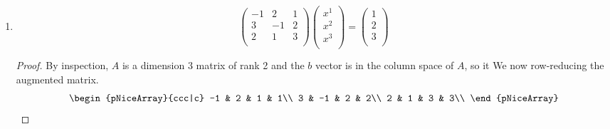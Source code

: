 \documentclass[../psets.tex]{subfiles}
\begin{document}
\begin{enumerate}
\begin{enumerate}
\begin{proof}
\begin{equation*}
\begin{pNiceArray}{cc|c}
                \end{pNiceArray}
            \end{equation*}
            Therefore, the solution is
            \begin{equation*}
                \boxed{
                    x =
                    \begin{pNiceMatrix}
                        \frac{1}{5}\\
                        -\frac{3}{5}\\
                    \end{pNiceMatrix}
                }
            \end{equation*}
        \end{proof}
        \item 
        \begin{equation*}
            \begin{pmatrix}
                -1 & 2 & 1\\
                3 & -1 & 2\\
                2 & 1 & 3\\
            \end{pmatrix}
            \begin{pmatrix}
                x^1\\
                x^2\\
                x^3\\
            \end{pmatrix}
            =
            \begin{pmatrix}
                1\\
                2\\
                3\\
            \end{pmatrix}
        \end{equation*}
        \begin{proof}
            By inspection, $A$ is a dimension 3 matrix of rank 2 and the $b$ vector is in the column space of $A$, so it  We now row-reducing the augmented matrix.
            \begin{equation*}
                \begin{pNiceArray}{ccc|c}
                    -1 & 2 & 1 & 1\\
                    3 & -1 & 2 & 2\\
                    2 & 1 & 3 & 3\\
                \end{pNiceArray}

\end{equation*}
\end{proof}
\end{enumerate}
\end{enumerate}
\end{document}
